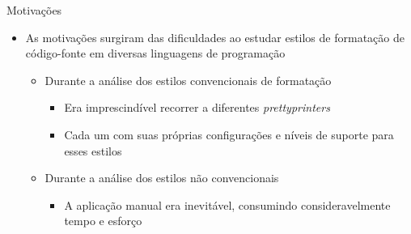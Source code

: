 \documentclass
  [ aspectratio=169,
    english,
    hyperref={citecolor=blue,colorlinks=true,linkcolor=blue,urlcolor=blue},
    brazil]
  {beamer}
\title{\worktitle}
\subtitle{\worksubtitle}
\author{Átila Gama Silva}
\date{\today}
\begin{document}


  \newlength{\halfpart}
  \setlength{\halfpart}{.5\textwidth - .5em}


  \newlength{\halftextwidthplustwoempart}
  \setlength{\halftextwidthplustwoempart}{.5\textwidth + 2em}
  \newlength{\halftextwidthplustwoemcounterpart}
  \setlength{\halftextwidthplustwoemcounterpart}{.5\textwidth - 3em}


  \newlength{\halftextwidthplusfiveempart}
  \setlength{\halftextwidthplusfiveempart}{.5\textwidth + 5em}
  \newlength{\halftextwidthplusfiveemcounterpart}
  \setlength{\halftextwidthplusfiveemcounterpart}{.5\textwidth - 6em}


  \begin{frame}\titlepage\end{frame}


  \begin{frame}{Motivações}
    \begin{itemize}
      \item As motivações surgiram das dificuldades ao estudar estilos de
            formatação de código-fonte em diversas linguagens de programação
            \begin{itemize}
              \item Durante a análise dos estilos convencionais de formatação
                    \begin{itemize}
                      \item Era imprescindível recorrer a diferentes
                            \textit{prettyprinters}
                      \item Cada um com suas próprias configurações e níveis de
                            suporte para esses estilos
                    \end{itemize}
              \item Durante a análise dos estilos não convencionais
                    \begin{itemize}
                      \item A aplicação manual era inevitável, consumindo
                            consideravelmente tempo e esforço
                    \end{itemize}
            \end{itemize}
    \end{itemize}
  \end{frame}
\end{document}
